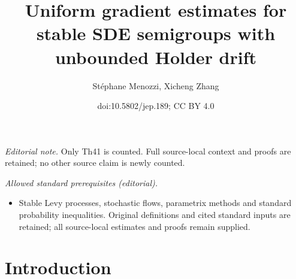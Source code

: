 \documentclass[11pt]{article}
\title{Uniform gradient estimates for stable SDE semigroups with unbounded Holder drift}
\author{Stéphane Menozzi, Xicheng Zhang}
\date{doi:10.5802/jep.189; CC BY 4.0}
\numberwithin{equation}{section}\providecommand{\asymp}{\mathrel{\sim}}
\theoremstyle{plain}
\theoremstyle{definition}
\newcommand\1{{\mathbf{1}}}
\begin{document}
\maketitle
\noindent\textit{Editorial note.} Only Th41 is counted. Full source-local context and proofs are retained; no other source claim is newly counted.\par\medskip
\noindent\textit{Allowed standard prerequisites (editorial).}\begin{itemize}
\item Stable Levy processes, stochastic flows, parametrix methods and standard probability inequalities. Original definitions and cited standard inputs are retained; all source-local estimates and proofs remain supplied.
\end{itemize}\medskip
\section{Introduction}
\end{document}
